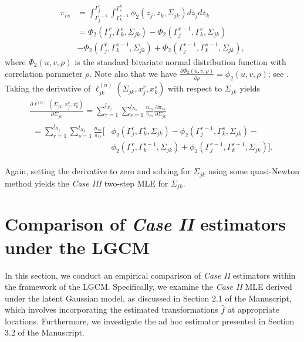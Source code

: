 \begin{equation}
    \begin{split}
        \pi_{rs} &= \int_{{\Gamma}_j^{r-1}}^{{\Gamma}_j^{r}} \int_{{\Gamma}_k^{s-1}}^{{\Gamma}^k_{s}} \phi_2(z_j,z_k,\Sigma_{jk}) dz_j dz_k \\
        &= \Phi_2({\Gamma}_j^r, {\Gamma}_k^s, \Sigma_{jk}) - \Phi_2({\Gamma}_j^{r-1}, {\Gamma}_k^s, \Sigma_{jk}) \\
        &- \Phi_2({\Gamma}_j^r, {\Gamma}_k^{s-1}, \Sigma_{jk}) + \Phi_2({\Gamma}_j^{r-1}, {\Gamma}_k^{s-1}, \Sigma_{jk}),
    \end{split}
\end{equation}
where $\Phi_2(u,v,\rho)$ is the standard bivariate normal distribution function with correlation parameter $\rho$. Note also that we have $\frac{\partial \Phi_2(u,v, \rho)}{\partial \rho} = \phi_2(u,v, \rho)$; see \citep{Tallis62}. Taking the derivative of $\ell_{jk}^{(n)}(\Sigma_{jk}, x_j^r,x_k^s)$ with respect to $\Sigma_{jk}$ yields
\begin{multline*}
    \frac{\partial \ell^{(n)}(\Sigma_{jk}, x_j^r,x_k^s)}{\partial \Sigma_{jk}} = \sum_{r=1}^{l_{X_{j}}}\sum_{s=1}^{l_{X_{k}}} \frac{n_{rs}}{\pi_{rs}} \frac{\partial \pi_{rs}}{\partial \Sigma_{jk}} \\
    \begin{aligned}
        = \sum_{r=1}^{l_{X_{j}}}\sum_{s=1}^{l_{X_{k}}} \frac{n_{rs}}{\pi_{rs}} \Big[ & \phi_2({\Gamma}_j^r, {\Gamma}_k^s, \Sigma_{jk}) - \phi_2({\Gamma}_j^{r-1}, {\Gamma}_k^s, \Sigma_{jk}) -             \\
                                                                                     & \phi_2({\Gamma}_j^r, {\Gamma}_k^{s-1}, \Sigma_{jk}) + \phi_2({\Gamma}_j^{r-1}, {\Gamma}_k^{s-1}, \Sigma_{jk})\Big].
    \end{aligned}
\end{multline*}

Again, setting the derivative to zero and solving for $\Sigma_{jk}$ using some quasi-Newton method yields the \textit{Case III} two-step MLE for $\Sigma_{jk}$.

\section{Comparison of \textit{Case II} estimators under the LGCM}\label{sec::case2_comparison}

In this section, we conduct an empirical comparison of \textit{Case II} estimators within the framework of the LGCM. Specifically, we examine the \textit{Case II} MLE derived under the latent Gaussian model, as discussed in Section 2.1 of the Manuscript, which involves incorporating the estimated transformations \(\hat{f}\) at appropriate locations. Furthermore, we investigate the ad hoc estimator presented in Section 3.2 of the Manuscript.

